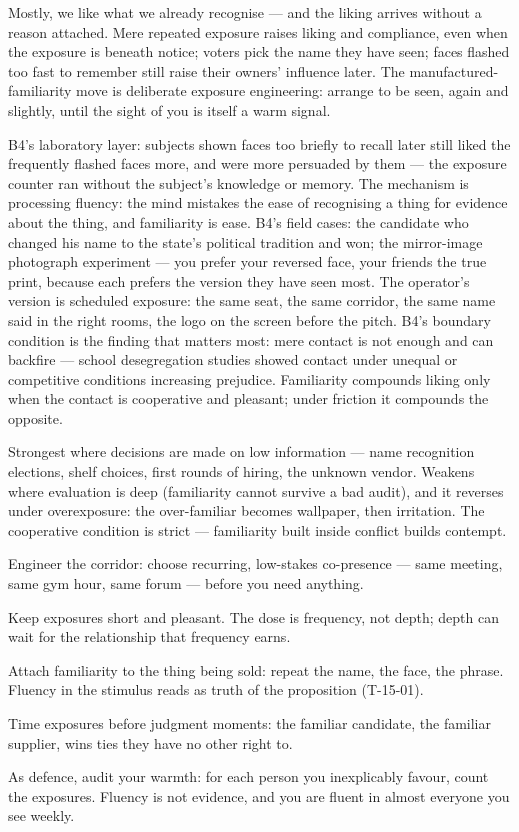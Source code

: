 \begin{core}
Mostly, we like what we already recognise --- and the liking arrives without a reason attached. Mere repeated exposure raises liking and compliance, even when the exposure is beneath notice; voters pick the name they have seen; faces flashed too fast to remember still raise their owners' influence later. The manufactured-familiarity move is deliberate exposure engineering: arrange to be seen, again and slightly, until the sight of you is itself a warm signal.
\end{core}
\begin{mechanism}
B4's laboratory layer: subjects shown faces too briefly to recall later still liked the frequently flashed faces more, and were more persuaded by them --- the exposure counter ran without the subject's knowledge or memory. The mechanism is processing fluency: the mind mistakes the ease of recognising a thing for evidence about the thing, and familiarity is ease. B4's field cases: the candidate who changed his name to the state's political tradition and won; the mirror-image photograph experiment --- you prefer your reversed face, your friends the true print, because each prefers the version they have seen most. The operator's version is scheduled exposure: the same seat, the same corridor, the same name said in the right rooms, the logo on the screen before the pitch. B4's boundary condition is the finding that matters most: mere contact is not enough and can backfire --- school desegregation studies showed contact under unequal or competitive conditions increasing prejudice. Familiarity compounds liking only when the contact is cooperative and pleasant; under friction it compounds the opposite.
\end{mechanism}
\begin{conditions}
Strongest where decisions are made on low information --- name recognition elections, shelf choices, first rounds of hiring, the unknown vendor. Weakens where evaluation is deep (familiarity cannot survive a bad audit), and it reverses under overexposure: the over-familiar becomes wallpaper, then irritation. The cooperative condition is strict --- familiarity built inside conflict builds contempt.
\end{conditions}
\begin{application}
  \item Engineer the corridor: choose recurring, low-stakes co-presence --- same meeting, same gym hour, same forum --- before you need anything.
  \item Keep exposures short and pleasant. The dose is frequency, not depth; depth can wait for the relationship that frequency earns.
  \item Attach familiarity to the thing being sold: repeat the name, the face, the phrase. Fluency in the stimulus reads as truth of the proposition (T-15-01).
  \item Time exposures before judgment moments: the familiar candidate, the familiar supplier, wins ties they have no other right to.
  \item As defence, audit your warmth: for each person you inexplicably favour, count the exposures. Fluency is not evidence, and you are fluent in almost everyone you see weekly.
\end{application}
